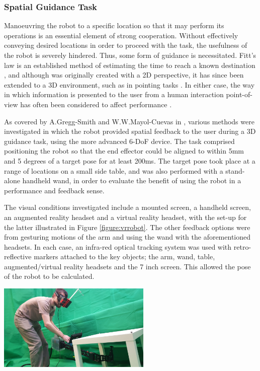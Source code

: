 \documentclass[11pt]{article}
\begin{document}
\subsubsection{Spatial Guidance Task}

Manoeuvring the robot to a specific location so that it may perform its operations is an essential element of strong cooperation. Without effectively conveying desired locations in order to proceed with the task, the usefulness of the robot is severely hindered. Thus, some form of guidance is necessitated. Fitt's law is an established method of estimating the time to reach a known destination \cite{fitts1954}, and although was originally created with a 2D perspective, it has since been extended to a 3D environment, such as in pointing tasks \cite{Cha2013}. In either case, the way in which information is presented to the user from a human interaction point-of-view has often been considered to affect performance \cite{soukoreff2004} \cite{MOTOYUKI1995}. 
  
As covered by A.Gregg-Smith and W.W.Mayol-Cuevas in \cite{GreggSmithFeedback}, various methods were investigated in which the robot provided spatial feedback to the user during a 3D guidance task, using the more advanced 6-DoF device. The task comprised positioning the robot so that the end effector could be aligned to within 5mm and 5 degrees of a target pose for at least 200ms. The target pose took place at a range of locations on a small side table, and was also performed with a stand-alone handheld wand, in order to evaluate the benefit of using the robot in a performance and feedback sense.

The visual conditions investigated include a mounted screen, a handheld screen, an augmented reality headset and a virtual reality headset, with the set-up for the latter illustrated in Figure \ref{figure:vrrobot}. The other feedback options were from gesturing motions of the arm and using the wand with the aforementioned headsets. In each case, an infra-red optical tracking system was used with retro-reflective markers attached to the key objects; the arm, wand, table, augmented/virtual reality headsets and the 7 inch screen. This allowed the pose of the robot to be calculated.

\begin{center}
\includegraphics[width=0.55\textwidth]{vrrobot.png}
\label{figure:vrrobot}
\end{center} 
 
\end{document}
